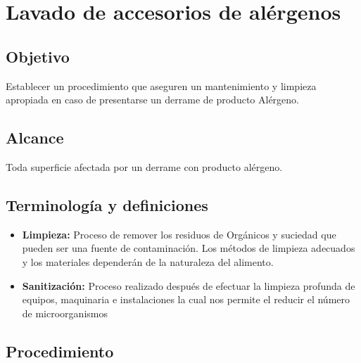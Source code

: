 \renewcommand{\MenorVer}{0}
\renewcommand{\MayorVer}{2}
\renewcommand{\Codigo}{HYS-13-IT}
\renewcommand{\FechaPub}{2023--01}
\renewcommand{\Titulo}{Lavado de accesorios de alérgenos}

\section{\Titulo}

\subsection{Objetivo}

Establecer un procedimiento que aseguren un mantenimiento y limpieza apropiada en caso de presentarse un derrame de producto Alérgeno.

\subsection{Alcance}

Toda superficie afectada por un derrame con producto alérgeno.

\subsection{Terminología y definiciones}

\begin{itemize}
	\item \textbf{Limpieza:} Proceso de remover los residuos de Orgánicos y suciedad que pueden ser una fuente de contaminación. Los métodos de limpieza adecuados y los materiales dependerán de la naturaleza del alimento.
	\item \textbf{Sanitización:} Proceso realizado después de efectuar la limpieza profunda de equipos, maquinaria e instalaciones la cual nos permite el reducir el número de microorganismos
\end{itemize}



\subsection{Procedimiento}

